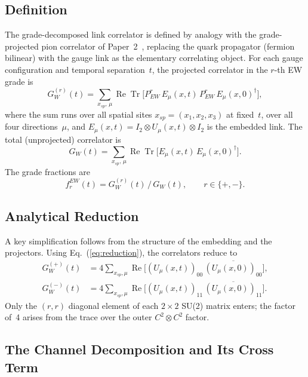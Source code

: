 \documentclass[12pt,a4paper]{article}
\renewcommand{\Re}{\operatorname{Re}}
\newcommand{\Tr}{\operatorname{Tr}}
\newcommand{\CC}{\mathbb{C}}
\newcommand{\Id}[1]{I_{#1}}
\newcommand{\Pew}[1]{P^{#1}_{\mathrm{EW}}}
\newcommand{\GW}[1]{G_W^{(#1)}}
\newcommand{\fEW}[1]{f_{#1}^{\mathrm{EW}}}
\def\CC{C}%
\def\mathbb#1{#1}%
\def\mathrm#1{#1}%
\begin{document}
	\subsection{Definition}
	
	The grade-decomposed link correlator is defined by analogy with the
	grade-projected pion correlator of Paper~2~\cite{P2}, replacing the quark
	propagator (fermion bilinear) with the gauge link as the elementary correlating
	object.  For each gauge configuration and temporal separation~$t$, the projected
	correlator in the $r$-th EW grade is
	\begin{equation}
		\GW{r}(t) = \sum_{x_{\mathrm{sp}},\,\mu}
		\Re\Tr\!\bigl[\Pew{r}\,E_\mu(x,t)\,\Pew{r}\,E_\mu(x,0)^\dagger\bigr],
	\end{equation}
	where the sum runs over all spatial sites $x_{\mathrm{sp}}=(x_1,x_2,x_3)$ at
	fixed~$t$, over all four directions~$\mu$, and
	$E_\mu(x,t)=\Id{2}\otimes U_\mu(x,t)\otimes\Id{2}$ is the embedded link.  The
	total (unprojected) correlator is
	\begin{equation}
		G_W(t) = \sum_{x_{\mathrm{sp}},\,\mu}
		\Re\Tr\!\bigl[E_\mu(x,t)\,E_\mu(x,0)^\dagger\bigr].
	\end{equation}
	The grade fractions are
	\begin{equation}
		\fEW{r}(t) = \GW{r}(t)\,/\,G_W(t),\qquad r\in\{+,-\}.
	\end{equation}
	
	\subsection{Analytical Reduction}
	
	A key simplification follows from the structure of the embedding and the projectors.
	Using Eq.~(\ref{eq:reduction}), the correlators reduce to
	\begin{align}
		\GW{+}(t) &= 4\sum_{x_{\mathrm{sp}},\mu}
		\Re\!\bigl[(U_\mu(x,t))_{00}\,\overline{(U_\mu(x,0))_{00}}\bigr],\\
		\GW{-}(t) &= 4\sum_{x_{\mathrm{sp}},\mu}
		\Re\!\bigl[(U_\mu(x,t))_{11}\,\overline{(U_\mu(x,0))_{11}}\bigr].
	\end{align}
	Only the $(r,r)$ diagonal element of each $2\times2$ SU(2) matrix enters; the
	factor of~4 arises from the trace over the outer $\CC^2\otimes\CC^2$ factor.
	
	\subsection{The Channel Decomposition and Its Cross Term}
	
\end{document}
